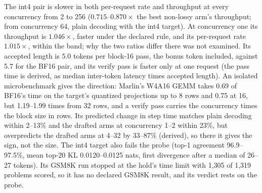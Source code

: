 The int4 pair is slower in both per-request rate and throughput at every concurrency from 2 to 256 ($0.715$--$0.870\times$ the best non-lossy arm's throughput; from concurrency 64, plain decoding with the int4 target). At concurrency one its throughput is $1.046\times$, faster under the declared rule, and its per-request rate $1.015\times$, within the band; why the two ratios differ there was not examined. Its accepted length is 5.0 tokens per block-16 pass, the bonus token included, against 5.7 for the BF16 pair, and its verify pass is faster only at one request (the pass time is derived, as median inter-token latency times accepted length). An isolated microbenchmark gives the direction: Marlin's W4A16 GEMM takes 0.69 of BF16's time on the target's quantized projections up to 8 rows and 0.75 at 16, but 1.19--1.99 times from 32 rows, and a verify pass carries the concurrency times the block size in rows. Its predicted change in step time matches plain decoding within 2--13\% and the drafted arms at concurrency 1--2 within 23\%, but overpredicts the drafted arms at 4--32 by 33--87\% (derived), so there it gives the sign, not the size. The int4 target also fails the probe (top-1 agreement 96.9--97.5\%, mean top-20 KL 0.0120--0.0125 nats, first divergence after a median of 26--27 tokens). Its GSM8K run stopped at the hold's time limit with 1,305 of 1,319 problems scored, so it has no declared GSM8K result, and its verdict rests on the probe.

